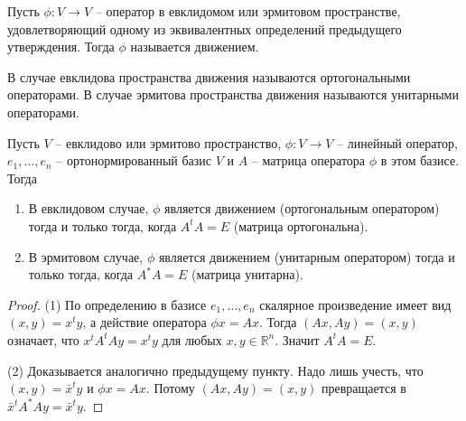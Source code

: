 \begin{definition}
Пусть $\phi\colon V\to V$ -- оператор в евклидомом или эрмитовом пространстве, удовлетворяющий одному из эквивалентных определений предыдущего утверждения.
Тогда $\phi$ называется движением.

В случае евклидова пространства движения называются ортогональными операторами.
В случае эрмитова пространства движения называются унитарными операторами.
\end{definition}

\begin{claim}
\label{claim::MovementMatrix}
Пусть $V$ -- евклидово или эрмитово пространство, $\phi\colon V\to V$ -- линейный оператор, $e_1,\ldots,e_n$ -- ортонормированный базис $V$ и $A$ -- матрица оператора $\phi$ в этом базисе.
Тогда
\begin{enumerate}
\item В евклидовом случае, $\phi$ является движением (ортогональным оператором) тогда и только тогда, когда $A^t A = E$ (матрица ортогональна).

\item В эрмитовом случае, $\phi$ является движением (унитарным оператором) тогда и только тогда, когда $A^*A = E$ (матрица унитарна).
\end{enumerate}
\end{claim}
\begin{proof}
(1) По определению в базисе $e_1,\ldots,e_n$ скалярное произведение имеет вид $(x,y) = x^t y$, а действие оператора $\phi x = A x$.
Тогда $(Ax, Ay) = (x, y)$ означает, что $x^t A^t A y = x^t y$ для любых $x,y\in \mathbb R^n$.
Значит $A^t A = E$.

(2) Доказывается аналогично предыдущему пункту.
Надо лишь учесть, что $(x, y) = \bar x^t y$ и $\phi x = Ax$.
Потому $(Ax, Ay) = (x,y)$ превращается в $\bar x^t A^* A y = \bar x^t y$.
\end{proof}

